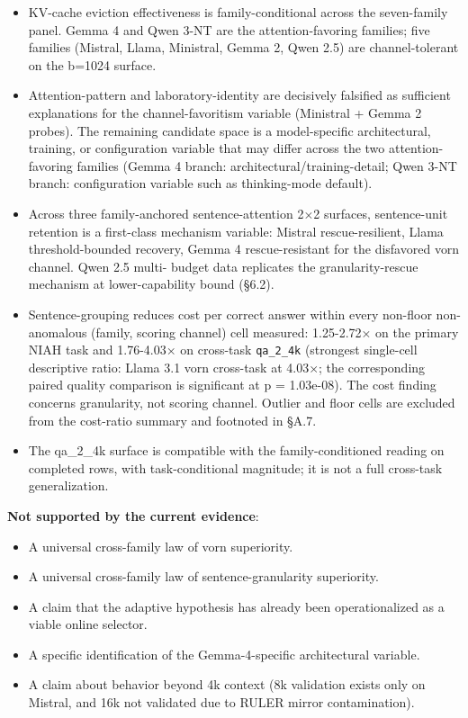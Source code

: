 \documentclass[
]{article}
\providecommand{\tightlist}{%
  \setlength{\itemsep}{0pt}\setlength{\parskip}{0pt}}
\begin{document}
\begin{itemize}
\tightlist
\item
  KV-cache eviction effectiveness is family-conditional across the
  seven-family panel. Gemma 4 and Qwen 3-NT are the attention-favoring
  families; five families (Mistral, Llama, Ministral, Gemma 2,
  Qwen 2.5) are channel-tolerant on the b=1024 surface.
\item
  Attention-pattern and laboratory-identity are decisively falsified
  as sufficient explanations for the channel-favoritism variable
  (Ministral + Gemma 2 probes). The remaining candidate space is a
  model-specific architectural, training, or configuration variable
  that may differ across the two attention-favoring families
  (Gemma 4 branch: architectural/training-detail; Qwen 3-NT branch:
  configuration variable such as thinking-mode default).
\item
  Across three family-anchored sentence-attention 2×2 surfaces,
  sentence-unit retention is a first-class mechanism variable: Mistral
  rescue-resilient, Llama threshold-bounded recovery, Gemma 4
  rescue-resistant for the disfavored vorn channel. Qwen 2.5 multi-
  budget data replicates the granularity-rescue mechanism at
  lower-capability bound (§6.2).
\item
  Sentence-grouping reduces cost per correct answer within every
  non-floor non-anomalous (family, scoring channel) cell measured:
  1.25-2.72× on the primary NIAH task and 1.76-4.03× on cross-task
  \texttt{qa\_2\_4k} (strongest single-cell descriptive ratio: Llama 3.1
  vorn cross-task at 4.03×; the corresponding paired quality
  comparison is significant at p = 1.03e-08). The cost finding concerns
  granularity, not scoring channel. Outlier and floor cells are
  excluded from the cost-ratio summary and footnoted in §A.7.
\item
  The qa\_2\_4k surface is compatible with the family-conditioned
  reading on completed rows, with task-conditional magnitude; it is
  not a full cross-task generalization.
\end{itemize}

\textbf{Not supported by the current evidence}:

\begin{itemize}
\tightlist
\item
  A universal cross-family law of vorn superiority.
\item
  A universal cross-family law of sentence-granularity superiority.
\item
  A claim that the adaptive hypothesis has already been operationalized
  as a viable online selector.
\item
  A specific identification of the Gemma-4-specific architectural
  variable.
\item
  A claim about behavior beyond 4k context (8k validation exists only on
  Mistral, and 16k not validated due to RULER mirror contamination).
\end{itemize}
\end{document}
